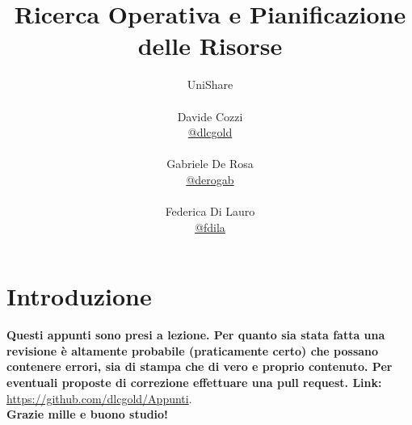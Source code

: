 \documentclass[a4paper,12pt, oneside]{book}
\title{Ricerca Operativa e Pianificazione delle Risorse}
\author{UniShare\\\\Davide Cozzi\\\href{https://t.me/dlcgold}{@dlcgold}\\\\Gabriele De Rosa\\\href{https://t.me/derogab}{@derogab} \\\\Federica Di Lauro\\\href{https://t.me/f_dila}{@f\textunderscore dila}}
\date{}
\begin{document}
\maketitle

\newtheorem{teorema}{Teorema}
\newtheorem{definizione}{Definizione}
\newtheorem{esempio}{Esempio}
\newtheorem{corollario}{Corollario}
\newtheorem{lemma}{Lemma}
\newtheorem{osservazione}{Osservazione}
\newtheorem{nota}{Nota}
\newtheorem{esercizio}{Esercizio}
\tableofcontents
\renewcommand{\chaptermark}[1]{%
	\markboth{\chaptername
		\ \thechapter.\ #1}{}}
\renewcommand{\sectionmark}[1]{\markright{\thesection.\ #1}}
\chapter{Introduzione}
\textbf{Questi appunti sono presi a lezione. Per quanto sia stata
  fatta una revisione è altamente probabile (praticamente certo)
  che possano contenere errori, sia di stampa che di vero e proprio
  contenuto. Per eventuali proposte di correzione effettuare una
  pull request. Link: } \url{https://github.com/dlcgold/Appunti}.\\
\textbf{Grazie mille e buono studio!}
\end{document}

